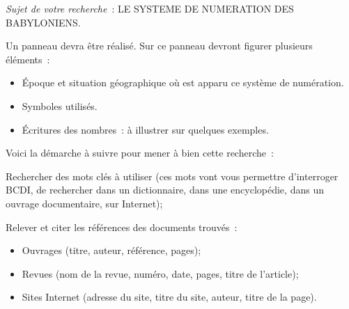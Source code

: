 {\em Sujet de votre recherche} : LE SYSTEME DE NUMERATION DES BABYLONIENS.

Un panneau devra être réalisé. Sur ce panneau devront figurer
plusieurs éléments :
\begin{itemize}
\item \'Epoque et situation géographique où est apparu ce système de
  numération.
\item Symboles utilisés.
\item \'Ecritures des nombres : à illustrer sur quelques exemples.
\end{itemize}

Voici la démarche à suivre pour mener à bien cette recherche :
\begin{myenumerate}
  \item Rechercher des mots clés à utiliser (ces mots vont vous
    permettre d'interroger BCDI, de rechercher dans un dictionnaire,
    dans une encyclopédie, dans un ouvrage documentaire, sur
    Internet);
  \item Relever et citer les références des documents trouvés :
    \begin{itemize}
    \item Ouvrages (titre, auteur, référence, pages);
    \item Revues (nom de la revue, numéro, date, pages, titre de
      l'article);
    \item Sites Internet (adresse du site, titre du site, auteur,
      titre de la page).
    \end{itemize}
\end{myenumerate}
